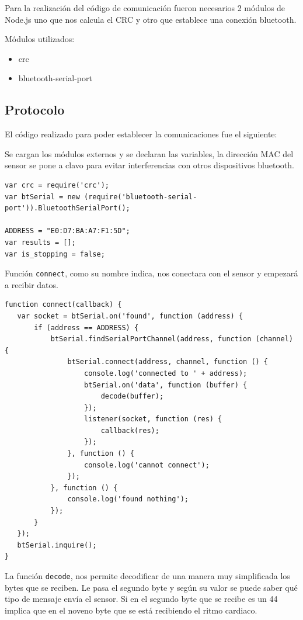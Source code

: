 Para la realización del código de comunicación fueron necesarios 2 módulos de Node.js uno que nos calcula el CRC y otro que establece una conexión bluetooth.

Módulos utilizados:

\begin{itemize}
\item crc
\item bluetooth-serial-port 
\end{itemize}
\pagebreak

\subsection{Protocolo}

El código realizado para poder establecer la comunicaciones fue el siguiente:
 
Se cargan los módulos externos y se declaran las variables, la dirección MAC del sensor se pone a clavo para evitar interferencias con otros dispositivos bluetooth.

\begin{verbatim}
var crc = require('crc');
var btSerial = new (require('bluetooth-serial-port')).BluetoothSerialPort();

ADDRESS = "E0:D7:BA:A7:F1:5D";
var results = [];
var is_stopping = false;
\end{verbatim}

Función \texttt{connect}, como su nombre indica, nos conectara con el sensor y empezará a recibir datos. 

\begin{verbatim}
function connect(callback) {
   var socket = btSerial.on('found', function (address) {
       if (address == ADDRESS) {
           btSerial.findSerialPortChannel(address, function (channel) {
               btSerial.connect(address, channel, function () {
                   console.log('connected to ' + address);
                   btSerial.on('data', function (buffer) {
                       decode(buffer);
                   });
                   listener(socket, function (res) {
                       callback(res);
                   });
               }, function () {
                   console.log('cannot connect');
               });
           }, function () {
               console.log('found nothing');
           });
       }
   });
   btSerial.inquire();
}
\end{verbatim}

La función \texttt{decode}, nos permite decodificar de una manera muy simplificada los bytes que se reciben. Le pasa el segundo byte y según su valor se puede saber qué tipo de mensaje envía el sensor. Si en el segundo byte que se recibe es un 44 implica que en el noveno byte que se está recibiendo el ritmo cardiaco.

